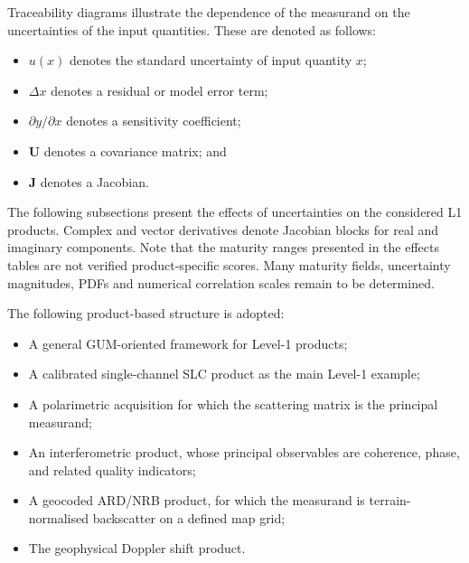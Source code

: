 Traceability diagrams illustrate the dependence of the measurand on the
uncertainties of the input quantities. These are denoted as follows:
\begin{itemize}
  \item $u(x)$ denotes the standard uncertainty of input quantity $x$;
  \item $\Delta x$ denotes a residual or model error term;
  \item $\partial y/\partial x$ denotes a sensitivity coefficient;
  \item $\mathbf{U}$ denotes a covariance matrix; and
  \item $\mathbf{J}$ denotes a Jacobian.
\end{itemize}




% 

The following subsections present the effects of uncertainties on the
considered \ac{L1} products. Complex and vector derivatives denote Jacobian
blocks for real and imaginary components. Note that the maturity ranges
presented in the effects tables are not verified product-specific scores. Many
maturity fields, uncertainty magnitudes, \acp{PDF} and numerical correlation
scales remain to be determined.


The following product-based structure is adopted:
\begin{itemize}
  \item A general \ac{GUM}-oriented framework for Level-1 products;
  \item A calibrated single-channel \ac{SLC} product as the main Level-1 example;
  \item A polarimetric acquisition for which the scattering matrix is the principal measurand;
  \item An interferometric product, whose principal observables are coherence, phase, and related quality indicators;
  \item A geocoded \ac{ARD}/\ac{NRB} product, for which the measurand is terrain-normalised backscatter on a defined map grid;
  \item The geophysical Doppler shift product.
\end{itemize}

